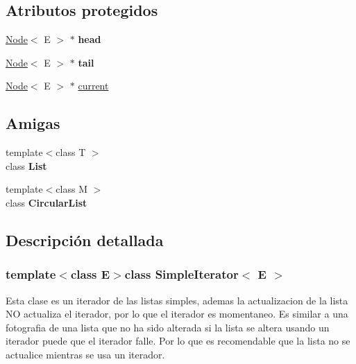 \subsection*{Atributos protegidos}
\begin{DoxyCompactItemize}
\item 
\hypertarget{classSimpleIterator_a0403100ab86dba958115cea4147508a7}{\hyperlink{classNode}{Node}$<$ E $>$ $\ast$ {\bfseries head}}\label{classSimpleIterator_a0403100ab86dba958115cea4147508a7}

\item 
\hypertarget{classSimpleIterator_a9bfb7d6c12bc1e8031b5c0869026415a}{\hyperlink{classNode}{Node}$<$ E $>$ $\ast$ {\bfseries tail}}\label{classSimpleIterator_a9bfb7d6c12bc1e8031b5c0869026415a}

\item 
\hyperlink{classNode}{Node}$<$ E $>$ $\ast$ \hyperlink{classSimpleIterator_a7777fefe265a5067ec9319d8c1a3e278}{current}
\end{DoxyCompactItemize}
\subsection*{Amigas}
\begin{DoxyCompactItemize}
\item 
\hypertarget{classSimpleIterator_a8740adf5dfdafdc64940ab42ed663bd2}{{\footnotesize template$<$class T $>$ }\\class {\bfseries List}}\label{classSimpleIterator_a8740adf5dfdafdc64940ab42ed663bd2}

\item 
\hypertarget{classSimpleIterator_ade98163865dd2cf1343ae0a4dbba6b29}{{\footnotesize template$<$class M $>$ }\\class {\bfseries Circular\-List}}\label{classSimpleIterator_ade98163865dd2cf1343ae0a4dbba6b29}

\end{DoxyCompactItemize}


\subsection{Descripción detallada}
\subsubsection*{template$<$class E$>$class Simple\-Iterator$<$ E $>$}

Esta clase es un iterador de las listas simples, ademas la actualizacion de la lista N\-O actualiza el iterador, por lo que el iterador es momentaneo. Es similar a una fotografia de una lista que no ha sido alterada si la lista se altera usando un iterador puede que el iterador falle. Por lo que es recomendable que la lista no se actualice mientras se usa un iterador. 

